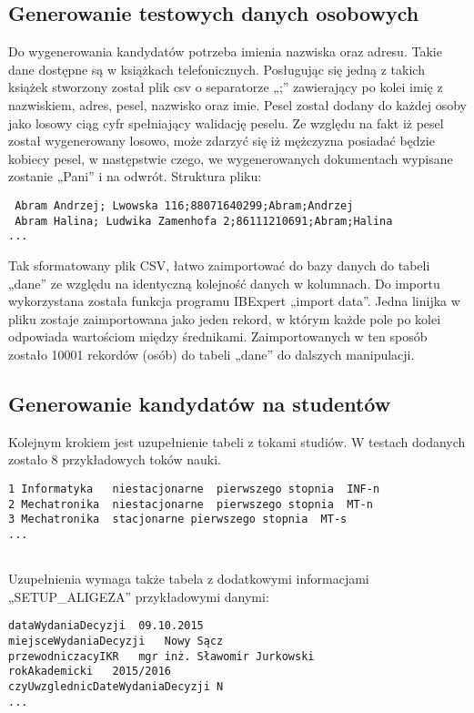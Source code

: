 \subsection{ Generowanie testowych danych osobowych}

Do wygenerowania kandydatów potrzeba imienia nazwiska oraz adresu. Takie dane dostępne są w książkach telefonicznych. Posługując się jedną z takich książek stworzony został plik csv o separatorze „;” zawierający po kolei imię z nazwiskiem, adres, pesel, nazwisko oraz imie. Pesel został dodany do każdej osoby jako losowy ciąg cyfr spełniający walidację peselu. Ze względu na fakt iż pesel został wygenerowany losowo, może zdarzyć się iż mężczyzna posiadać będzie kobiecy pesel, w następstwie czego, we wygenerowanych dokumentach wypisane zostanie „Pani” i na odwrót.
Struktura pliku:
\begin{verbatim}
 Abram Andrzej; Lwowska 116;88071640299;Abram;Andrzej
 Abram Halina; Ludwika Zamenhofa 2;86111210691;Abram;Halina
...

\end{verbatim}

Tak sformatowany plik CSV,  łatwo zaimportować do bazy danych do tabeli „dane” ze względu na identyczną kolejność danych w kolumnach. Do importu wykorzystana została funkcja programu IBExpert „import data”. Jedna linijka w pliku zostaje zaimportowana jako jeden rekord, w którym każde pole po kolei odpowiada wartościom między średnikami. Zaimportowanych w ten sposób zostało 10001 rekordów (osób) do tabeli „dane” do dalszych manipulacji.

\subsection{Generowanie kandydatów na studentów}

Kolejnym krokiem jest uzupełnienie tabeli z tokami studiów. W testach dodanych zostało 8 przykładowych toków nauki. 

\begin{verbatim}
1 Informatyka	niestacjonarne	pierwszego stopnia	INF-n				
2 Mechatronika	niestacjonarne	pierwszego stopnia	MT-n				
3 Mechatronika	stacjonarne	pierwszego stopnia	MT-s				
...


\end{verbatim}
Uzupełnienia wymaga także tabela z dodatkowymi informacjami „SETUP\_ALIGEZA” przykładowymi danymi:
\begin{verbatim}
dataWydaniaDecyzji	09.10.2015
miejsceWydaniaDecyzji	Nowy Sącz
przewodniczacyIKR	mgr inż. Sławomir Jurkowski
rokAkademicki	2015/2016
czyUwzglednicDateWydaniaDecyzji	N
...

\end{verbatim}

